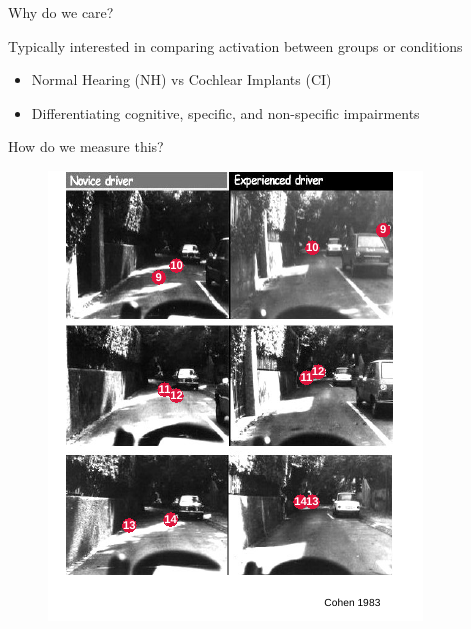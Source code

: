 \documentclass{beamer}
\begin{document}
\begin{frame}{Why do we care?}

Typically interested in comparing activation between groups or conditions \vspace{2mm}

\begin{itemize}
\item Normal Hearing (NH) vs Cochlear Implants (CI) \vspace{2mm}
\item Differentiating cognitive, specific, and non-specific impairments \vspace{2mm}
\end{itemize}

How do we measure this?


\end{frame}


\begin{frame}%
\vspace{-1mm}
\begin{figure}
\centering
\includegraphics[scale=1.32]{img/edit_car_eye.pdf}
\end{figure}
\end{frame}



\end{document}
